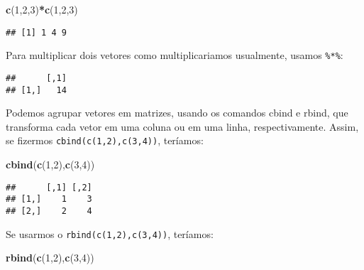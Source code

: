 \documentclass[]{book}
\newenvironment{Shaded}{\begin{snugshade}}{\end{snugshade}}
\newcommand{\KeywordTok}[1]{\textcolor[rgb]{0.13,0.29,0.53}{\textbf{#1}}}
\newcommand{\DecValTok}[1]{\textcolor[rgb]{0.00,0.00,0.81}{#1}}
\newcommand{\OperatorTok}[1]{\textcolor[rgb]{0.81,0.36,0.00}{\textbf{#1}}}
\newcommand{\NormalTok}[1]{#1}
\begin{document}
\begin{Shaded}
\begin{Highlighting}[]
\KeywordTok{c}\NormalTok{(}\DecValTok{1}\NormalTok{,}\DecValTok{2}\NormalTok{,}\DecValTok{3}\NormalTok{)}\OperatorTok{*}\KeywordTok{c}\NormalTok{(}\DecValTok{1}\NormalTok{,}\DecValTok{2}\NormalTok{,}\DecValTok{3}\NormalTok{)}
\end{Highlighting}
\end{Shaded}

\begin{verbatim}
## [1] 1 4 9
\end{verbatim}

Para multiplicar dois vetores como multiplicariamos usualmente, usamos
\texttt{\%*\%}:

\begin{Shaded}
\end{Shaded}

\begin{verbatim}
##      [,1]
## [1,]   14
\end{verbatim}

Podemos agrupar vetores em matrizes, usando os comandos cbind e rbind,
que transforma cada vetor em uma coluna ou em uma linha,
respectivamente. Assim, se fizermos \texttt{cbind(c(1,2),c(3,4))},
teríamos:

\begin{Shaded}
\begin{Highlighting}[]
\KeywordTok{cbind}\NormalTok{(}\KeywordTok{c}\NormalTok{(}\DecValTok{1}\NormalTok{,}\DecValTok{2}\NormalTok{),}\KeywordTok{c}\NormalTok{(}\DecValTok{3}\NormalTok{,}\DecValTok{4}\NormalTok{))}
\end{Highlighting}
\end{Shaded}

\begin{verbatim}
##      [,1] [,2]
## [1,]    1    3
## [2,]    2    4
\end{verbatim}

Se usarmos o \texttt{rbind(c(1,2),c(3,4))}, teríamos:

\begin{Shaded}
\begin{Highlighting}[]
\KeywordTok{rbind}\NormalTok{(}\KeywordTok{c}\NormalTok{(}\DecValTok{1}\NormalTok{,}\DecValTok{2}\NormalTok{),}\KeywordTok{c}\NormalTok{(}\DecValTok{3}\NormalTok{,}\DecValTok{4}\NormalTok{))}
\end{Highlighting}
\end{Shaded}
\end{document}
